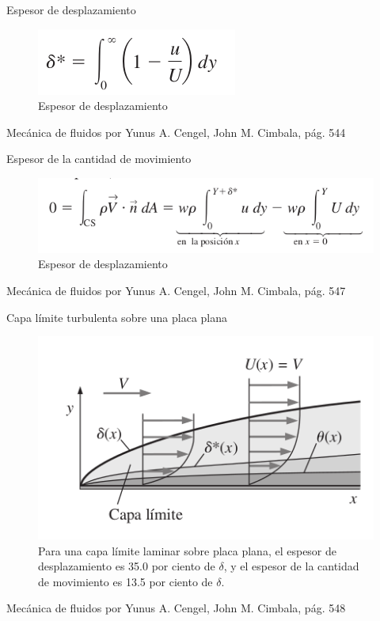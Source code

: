 
\begin{frame}{Espesor de desplazamiento}
\justifying
\begin{figure}[H]
\centering
\includegraphics[scale=0.25]{Section_Files/S3-imagenes-Jhon/0211.png}
\caption{Espesor de desplazamiento}
\end{figure}
{\tiny Mecánica de fluidos por Yunus A. Cengel, John M. Cimbala, pág. 544}
\end{frame}


\begin{frame}{Espesor de la cantidad de movimiento}
\justifying
\begin{figure}[H]
\centering
\includegraphics[scale=0.25]{Section_Files/S3-imagenes-Jhon/0219.png}
\caption{Espesor de desplazamiento}
\end{figure}
{\tiny Mecánica de fluidos por Yunus A. Cengel, John M. Cimbala, pág. 547}
\end{frame}


\begin{frame}{Capa límite turbulenta sobre una placa plana}
\justifying
\begin{figure}[H]
\centering
\includegraphics[scale=0.25]{Section_Files/S3-imagenes-Jhon/0231.png}
\caption{Para una capa límite laminar sobre placa plana, el espesor de desplazamiento es 35.0 por ciento de $ \delta $, y el espesor de la cantidad de movimiento es 13.5 por ciento de $ \delta $. }
\end{figure}
{\tiny Mecánica de fluidos por Yunus A. Cengel, John M. Cimbala, pág. 548}
\end{frame}

